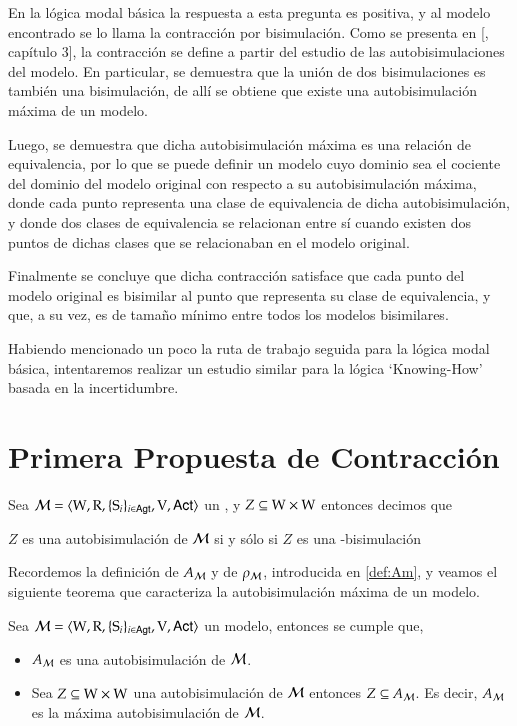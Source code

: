 En la lógica modal básica la respuesta a esta pregunta es positiva, y al modelo encontrado se lo llama la contracción por bisimulación.
Como se presenta en [\cite{HandbookModalLogic}, capítulo 3], la contracción se define a partir del estudio de las autobisimulaciones del modelo. En particular,
se demuestra que la unión de dos bisimulaciones es también una bisimulación, de allí se obtiene que existe una autobisimulación máxima de un modelo.

Luego, se demuestra que dicha autobisimulación máxima es una relación de equivalencia, por lo que se puede definir un modelo cuyo dominio sea el cociente
del dominio del modelo original con respecto a su autobisimulación máxima, donde cada punto representa una clase de equivalencia de dicha autobisimulación, y donde 
dos clases de equivalencia se relacionan entre sí cuando existen dos puntos de dichas clases que se relacionaban en el modelo original.

Finalmente se concluye que dicha contracción satisface que cada punto del modelo original es bisimilar al punto que representa su clase de equivalencia, y 
que, a su vez, es de tamaño mínimo entre todos los modelos bisimilares.

Habiendo mencionado un poco la ruta de trabajo seguida para la lógica modal básica, intentaremos realizar un estudio similar para la lógica `Knowing-How' basada en la 
incertidumbre.

\section{Primera Propuesta de Contracción}

\begin{definicion}
    Sea $\mathcal{M}=\langle \mathrm{W},\mathrm{R},\{ \mathrm{S}_i \}_{i \in {\rm \sf Agt}},\mathrm{V},{\rm \sf Act} \rangle$ un \ults, y $Z \subseteq \mathrm{W} \times \mathrm{W}$ entonces decimos que
    \begin{center}
        $Z$ es una autobisimulación de $\mathcal{M}$ si y sólo si $Z$ es una \KHilogic-bisimulación        
    \end{center}
\end{definicion}

Recordemos la definición de $A_{\mathcal{M}}$ y de $\rho_{\mathcal{M}}$, introducida en \ref{def:Am}, y veamos el siguiente teorema 
que caracteriza la autobisimulación máxima de un modelo.

\begin{teorema}
    Sea $\mathcal{M}=\langle \mathrm{W},\mathrm{R},\{ \mathrm{S}_i \}_{i \in {\rm \sf Agt}},\mathrm{V},{\rm \sf Act} \rangle$ un modelo, entonces se cumple que,
    \begin{itemize}
        \item $A_{\mathcal{M}}$ es una autobisimulación de $\mathcal{M}$.
        \item Sea $Z \subseteq \mathrm{W} \times \mathrm{W}$ una autobisimulación de $\mathcal{M}$ entonces $Z \subseteq A_{\mathcal{M}}$. 
        Es decir, $A_{\mathcal{M}} $ es la máxima autobisimulación de $\mathcal{M}$. 
    \end{itemize}
\end{teorema}


